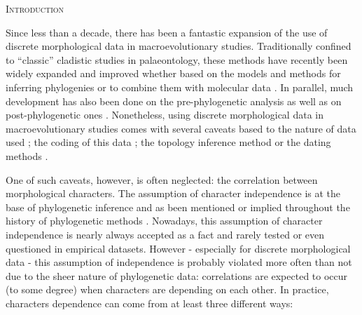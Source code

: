 \documentclass[12pt,letterpaper]{article}
\renewcommand{\section}[1]{%
\bigskip
\begin{center}
\begin{Large}
\normalfont\scshape #1
\medskip
\end{Large}
\end{center}}
\begin{document}
\newpage 

%
%
\section{Introduction}

Since less than a decade, there has been a fantastic expansion of the use of discrete morphological data in macroevolutionary studies.
Traditionally confined to ``classic'' cladistic studies in palaeontology, these methods have recently been widely expanded and improved whether based on the models and methods for inferring phylogenies \citep[e.g.][]{heath2014fossilized,Wright01072016} or to combine them with molecular data \citep[e.g.][]{pyrondivergence2011,ronquista2012}.
In parallel, much development has also been done on the pre-phylogenetic analysis \citep[e.g. data collection;][]{morphobank} as well as on post-phylogenetic ones \citep[e.g. morphological disparity analysis;][]{Close2015,Claddis}.
Nonetheless, using discrete morphological data in macroevolutionary studies comes with several caveats based to the nature of data used \citep{Guillerme2016146,bapst2017combined}; the coding of this data \citep{Brazeau2011,simoes2017giant}; the topology inference method \citep{spencerefficacy2013,wrightbayesian2014,OReilly20160081,puttick2017uncertain,goloboff2017weighted} or the dating methods \citep{Arcila2015131,o2016tips}.

One of such caveats, however, is often neglected: the correlation between morphological characters.
The assumption of character independence is at the base of phylogenetic inference and as been mentioned or implied throughout the history of phylogenetic methods \citep[e.g.][]{joysey1982problems,felsenstein1985phylogenies,lewisa2001,felsenstein2004inferring}.
Nowadays, this assumption of character independence is nearly always accepted as a fact and rarely tested or even questioned in empirical datasets.
However - especially for discrete morphological data - this assumption of independence is probably violated more often than not due to the sheer nature of phylogenetic data: correlations are expected to occur (to some degree) when characters are depending on each other.
In practice, characters dependence can come from at least three different ways:
\end{document}
